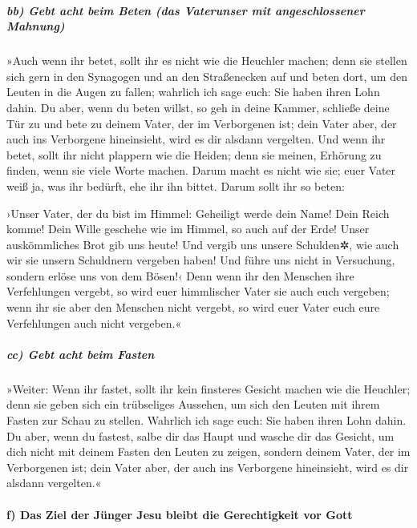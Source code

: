 \hypertarget{bb-gebt-acht-beim-beten-das-vaterunser-mit-angeschlossener-mahnung}{%
\subparagraph{bb) Gebt acht beim Beten (das Vaterunser mit
angeschlossener
Mahnung)}\label{bb-gebt-acht-beim-beten-das-vaterunser-mit-angeschlossener-mahnung}}

 »Auch wenn ihr betet, sollt ihr es nicht wie die Heuchler
machen; denn sie stellen sich gern in den Synagogen und an den
Straßenecken auf und beten dort, um den Leuten in die Augen zu fallen;
wahrlich ich sage euch: Sie haben ihren Lohn dahin.  Du
aber, wenn du beten willst, so geh in deine Kammer, schließe deine Tür
zu und bete zu deinem Vater, der im Verborgenen ist; dein Vater aber,
der auch ins Verborgene hineinsieht, wird es dir alsdann vergelten.
 Und wenn ihr betet, sollt ihr nicht plappern wie die
Heiden; denn sie meinen, Erhörung zu finden, wenn sie viele Worte
machen.  Darum macht es nicht wie sie; euer Vater weiß ja,
was ihr bedürft, ehe ihr ihn bittet.  Darum sollt ihr so
beten:

›Unser Vater, der du bist im Himmel: Geheiligt werde dein Name!
 Dein Reich komme! Dein Wille geschehe wie im Himmel, so
auch auf der Erde!  Unser auskömmliches Brot gib uns
heute!  Und vergib uns unsere Schulden✲, wie auch wir sie
unsern Schuldnern vergeben haben!  Und führe uns nicht in
Versuchung, sondern erlöse uns von dem Bösen!‹  Denn wenn
ihr den Menschen ihre Verfehlungen vergebt, so wird euer himmlischer
Vater sie auch euch vergeben;  wenn ihr sie aber den
Menschen nicht vergebt, so wird euer Vater euch eure Verfehlungen auch
nicht vergeben.«

\hypertarget{cc-gebt-acht-beim-fasten}{%
\subparagraph{cc) Gebt acht beim
Fasten}\label{cc-gebt-acht-beim-fasten}}

 »Weiter: Wenn ihr fastet, sollt ihr kein finsteres
Gesicht machen wie die Heuchler; denn sie geben sich ein trübseliges
Aussehen, um sich den Leuten mit ihrem Fasten zur Schau zu stellen.
Wahrlich ich sage euch: Sie haben ihren Lohn dahin.  Du
aber, wenn du fastest, salbe dir das Haupt und wasche dir das Gesicht,
 um dich nicht mit deinem Fasten den Leuten zu zeigen,
sondern deinem Vater, der im Verborgenen ist; dein Vater aber, der auch
ins Verborgene hineinsieht, wird es dir alsdann vergelten.«

\hypertarget{f-das-ziel-der-juxfcnger-jesu-bleibt-die-gerechtigkeit-vor-gott}{%
\paragraph{f) Das Ziel der Jünger Jesu bleibt die Gerechtigkeit vor
Gott}\label{f-das-ziel-der-juxfcnger-jesu-bleibt-die-gerechtigkeit-vor-gott}}

